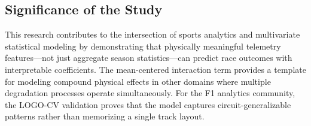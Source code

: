 \subsection{Significance of the Study}

This research contributes to the intersection of sports analytics and
multivariate statistical modeling by demonstrating that physically meaningful
telemetry features---not just aggregate season statistics---can predict race
outcomes with interpretable coefficients. The mean-centered interaction term
provides a template for modeling compound physical effects in other domains
where multiple degradation processes operate simultaneously. For the F1
analytics community, the LOGO-CV validation proves that the model captures
circuit-generalizable patterns rather than memorizing a single track layout.
